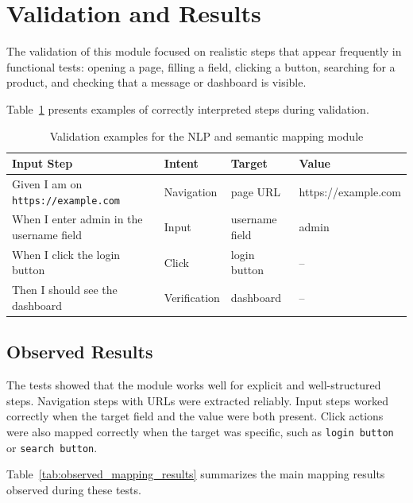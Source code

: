 \section{Validation and Results}
\label{sec:nlp_validation_results}

The validation of this module focused on realistic steps that appear frequently in functional tests: opening a page, filling a field, clicking a button, searching for a product, and checking that a message or dashboard is visible.

Table~\ref{tab:nlp_validation_examples} presents examples of correctly interpreted steps during validation.

\begin{table}[H]
	\centering
	\caption{Validation examples for the NLP and semantic mapping module}
	\label{tab:nlp_validation_examples}
	\renewcommand{\arraystretch}{1.3}
	\small
	\begin{tabularx}{\textwidth}{|X|l|X|X|}
		\hline
		\rowcolor{gray!20}
		\textbf{Input Step} & \textbf{Intent} & \textbf{Target} & \textbf{Value} \\ \hline
		Given I am on \texttt{https://example.com} & Navigation & page URL & https://example.com \\ \hline
		When I enter admin in the username field & Input & username field & admin \\ \hline
		When I click the login button & Click & login button & -- \\ \hline
		Then I should see the dashboard & Verification & dashboard & -- \\ \hline
	\end{tabularx}
\end{table}

\subsection{Observed Results}
\label{subsec:observed_results}

The tests showed that the module works well for explicit and well-structured steps. Navigation steps with URLs were extracted reliably. Input steps worked correctly when the target field and the value were both present. Click actions were also mapped correctly when the target was specific, such as \texttt{login button} or \texttt{search button}.

Table~\ref{tab:observed_mapping_results} summarizes the main mapping results observed during these tests.

